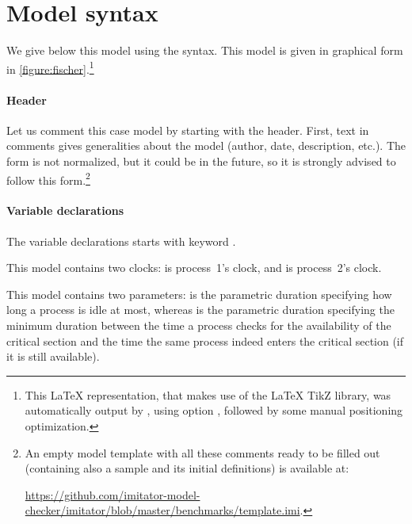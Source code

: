 \section{Model syntax}

We give below this model using the \imitator{} syntax.
This model is given in graphical form in \cref{figure:fischer}.\footnote{%
	This \LaTeX{} representation, that makes use of the \LaTeX{} TikZ library, was automatically output by \imitator{}, using option , followed by some manual positioning optimization.
}

\bigskip





\paragraph{Header}
Let us comment this case model by starting with the header.
First, text in comments gives generalities about the model (author, date, description, etc.).
The form is not normalized, but it could be in the future, so it is strongly advised to follow this form.\footnote{%
	An empty model template with all these comments ready to be filled out (containing also a sample \IPTA{} and its initial definitions) is available at:

	\url{https://github.com/imitator-model-checker/imitator/blob/master/benchmarks/template.imi}.
}

\paragraph{Variable declarations}
The variable declarations starts with keyword .

This model contains two clocks:  is process~1's clock, and  is process~2's clock.

This model contains two parameters:  is the parametric duration specifying how long a process is idle at most, whereas  is the parametric duration specifying the minimum duration between the time a process checks for the availability of the critical section and the time the same process indeed enters the critical section (if it is still available).

